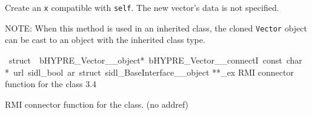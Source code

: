\documentclass{article}
\begin{document}
\begin{cxxentry}
\begin{cxxfunction}
\begin{cxxdoc}
Create an {\tt x} compatible with {\tt self}.
The new vector's data is not specified.

NOTE: When this method is used in an inherited class, the
cloned {\tt Vector} object can be cast to an object with the
inherited class type.
\end{cxxdoc}
\end{cxxfunction}
\begin{cxxvariable}
{\ struct\ \ bHYPRE\_Vector\_\_object*\ bHYPRE\_Vector\_\_connectI\ const\ char\ *\ url\ sidl\_bool\ ar\ struct\ sidl\_BaseInterface\_\_object}
        {**\_ex}
        {}
        {
RMI connector function for the class}
        {3.4}
\begin{cxxdoc}

RMI connector function for the class. (no addref)
\end{cxxdoc}
\end{cxxvariable}
\end{cxxentry}
\end{document}
